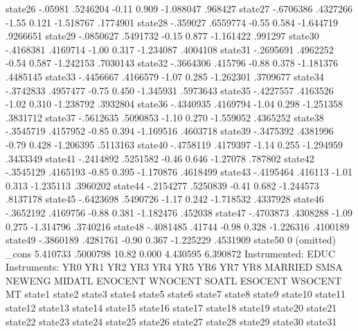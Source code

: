      state26 {\VBAR}    -.05981   .5246204    -0.11   0.909    -1.088047     .968427
     state27 {\VBAR}  -.6706386   .4327266    -1.55   0.121    -1.518767    .1774901
     state28 {\VBAR}   -.359027   .6559774    -0.55   0.584    -1.644719    .9266651
     state29 {\VBAR}  -.0850627   .5491732    -0.15   0.877    -1.161422     .991297
     state30 {\VBAR}  -.4168381   .4169714    -1.00   0.317    -1.234087    .4004108
     state31 {\VBAR}  -.2695691   .4962252    -0.54   0.587    -1.242153    .7030143
     state32 {\VBAR}  -.3664306    .415796    -0.88   0.378    -1.181376    .4485145
     state33 {\VBAR}  -.4456667   .4166579    -1.07   0.285    -1.262301    .3709677
     state34 {\VBAR}  -.3742833   .4957477    -0.75   0.450    -1.345931    .5973643
     state35 {\VBAR}  -.4227557   .4163526    -1.02   0.310    -1.238792    .3932804
     state36 {\VBAR}  -.4340935   .4169794    -1.04   0.298    -1.251358    .3831712
     state37 {\VBAR}  -.5612635   .5090853    -1.10   0.270    -1.559052    .4365252
     state38 {\VBAR}  -.3545719   .4157952    -0.85   0.394    -1.169516    .4603718
     state39 {\VBAR}  -.3475392   .4381996    -0.79   0.428    -1.206395    .5113163
     state40 {\VBAR}  -.4758119   .4179397    -1.14   0.255    -1.294959    .3433349
     state41 {\VBAR}  -.2414892   .5251582    -0.46   0.646     -1.27078     .787802
     state42 {\VBAR}  -.3545129   .4165193    -0.85   0.395    -1.170876    .4618499
     state43 {\VBAR}  -.4195464    .416113    -1.01   0.313    -1.235113    .3960202
     state44 {\VBAR}  -.2154277   .5250839    -0.41   0.682    -1.244573    .8137178
     state45 {\VBAR}  -.6423698   .5490726    -1.17   0.242    -1.718532    .4337928
     state46 {\VBAR}  -.3652192   .4169756    -0.88   0.381    -1.182476     .452038
     state47 {\VBAR}  -.4703873   .4308288    -1.09   0.275    -1.314796    .3740216
     state48 {\VBAR}  -.4081485     .41744    -0.98   0.328    -1.226316    .4100189
     state49 {\VBAR}  -.3860189   .4281761    -0.90   0.367    -1.225229    .4531909
     state50 {\VBAR}          0  (omitted)
       _cons {\VBAR}   5.410733   .5000798    10.82   0.000     4.430595    6.390872
Instrumented:  EDUC
Instruments:   YR0 YR1 YR2 YR3 YR4 YR5 YR6 YR7 YR8 MARRIED SMSA NEWENG
               MIDATL ENOCENT WNOCENT SOATL ESOCENT WSOCENT MT state1 state2
               state3 state4 state5 state6 state7 state8 state9 state10
               state11 state12 state13 state14 state15 state16 state17
               state18 state19 state20 state21 state22 state23 state24
               state25 state26 state27 state28 state29 state30 state31
